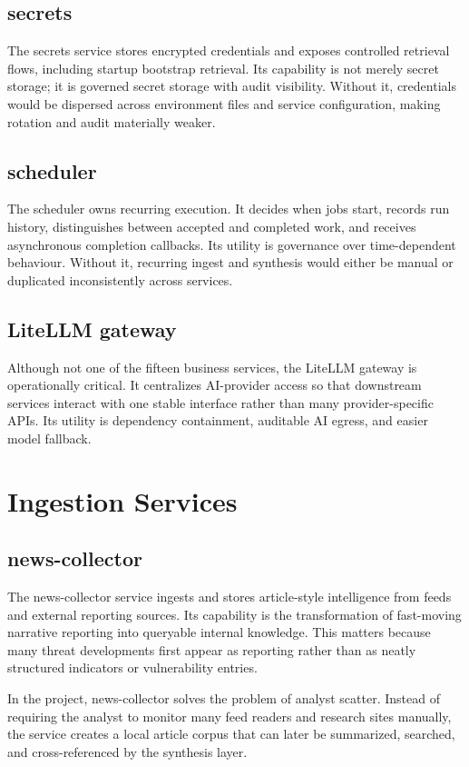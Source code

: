 \subsection{secrets}
The secrets service stores encrypted credentials and exposes controlled retrieval flows, including startup bootstrap retrieval. Its capability is not merely secret storage; it is governed secret storage with audit visibility. Without it, credentials would be dispersed across environment files and service configuration, making rotation and audit materially weaker.

\subsection{scheduler}
The scheduler owns recurring execution. It decides when jobs start, records run history, distinguishes between accepted and completed work, and receives asynchronous completion callbacks. Its utility is governance over time-dependent behaviour. Without it, recurring ingest and synthesis would either be manual or duplicated inconsistently across services.

\subsection{LiteLLM gateway}
Although not one of the fifteen business services, the LiteLLM gateway is operationally critical. It centralizes AI-provider access so that downstream services interact with one stable interface rather than many provider-specific APIs. Its utility is dependency containment, auditable AI egress, and easier model fallback.

\section{Ingestion Services}
\subsection{news-collector}
The news-collector service ingests and stores article-style intelligence from feeds and external reporting sources. Its capability is the transformation of fast-moving narrative reporting into queryable internal knowledge. This matters because many threat developments first appear as reporting rather than as neatly structured indicators or vulnerability entries.

In the project, news-collector solves the problem of analyst scatter. Instead of requiring the analyst to monitor many feed readers and research sites manually, the service creates a local article corpus that can later be summarized, searched, and cross-referenced by the synthesis layer.

